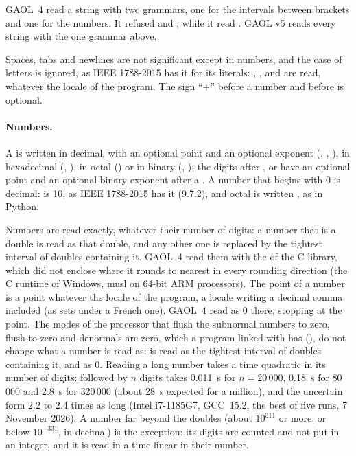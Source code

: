 \begin{Rem}
GAOL~4 read a string with two grammars, one for the intervals between
brackets and one for the numbers. It refused  and
, while it read . GAOL v5 reads every
string with the one grammar above.\newinvfive
\end{Rem}

Spaces, tabs and newlines are not significant except in numbers, and the
case of letters is ignored, as IEEE 1788-2015 has it for its literals:
\code{[Empty]}, \code{[1, Inf]},  and  are read,
whatever the locale of the program.\newinvfive{} The sign ``$+$'' before a
number and before  is optional.

\paragraph{Numbers.} A  is written in decimal, with an optional
point and an optional exponent (, , ), in
hexadecimal (, ), in octal () or in
binary (, ); the digits after , 
or  have an optional point and an optional binary exponent after a
.\newinvfive{} A number that begins with 0 is decimal:  is
10, as IEEE 1788-2015 has it (9.7.2), and octal is written , as
in Python.
%

Numbers are read exactly, whatever their number of digits: a number that is
a double is read as that double, and any other one is replaced by the
tightest interval of doubles containing it.\newinvfive{} GAOL~4 read them
with the  of the C library, which did not enclose 
where it rounds to nearest in every rounding direction (the C runtime of
Windows, musl on 64-bit ARM processors). The point of a number is a point
whatever the locale of the program, a locale writing a decimal comma
included (as  sets under a French
one).\newinvfive{} GAOL~4 read  as 0 there, 
stopping at the point. The modes of the processor that flush the subnormal
numbers to zero, flush-to-zero and denormals-are-zero, which a program
linked with  has (), do not change what a
number is read as:  is read as the tightest interval of doubles
containing it, and  as 0.\newinvfive{} Reading a long number takes a
time quadratic in its number of digits:  followed by $n$ digits
 takes 0.011~s for $n = 20\,000$, 0.18~s for 80\,000 and 2.8~s for
320\,000 (about 28~s expected for a million), and the uncertain form 2.2 to 2.4
times as long (Intel i7-1185G7, GCC~15.2, the best of five runs,
7 November 2026). A number far beyond the doubles (about $10^{311}$ or more, or
below $10^{-331}$, in decimal) is the exception: its digits are counted and not
put in an integer, and it is read in a time linear in their number.\newinvfive

